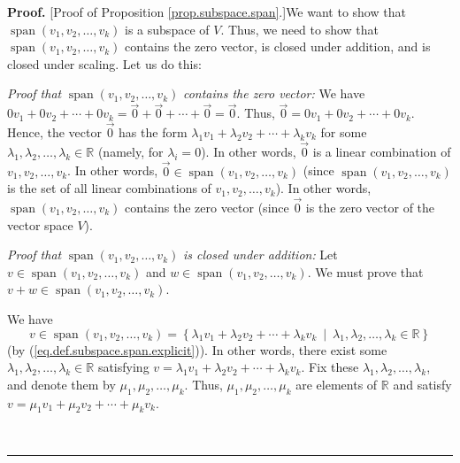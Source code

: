 \documentclass[numbers=enddot,12pt,final,onecolumn,notitlepage]{scrartcl}%
\theoremstyle{definition}
\newenvironment{proof}[1][Proof]{\noindent\textbf{#1.} }{\ \rule{0.5em}{0.5em}}
\begin{document}
\begin{proof}
[Proof of Proposition \ref{prop.subspace.span}.]We want to show that
$\operatorname{span}\left(  v_{1},v_{2},\ldots,v_{k}\right)  $ is a subspace
of $V$. Thus, we need to show that $\operatorname{span}\left(  v_{1}%
,v_{2},\ldots,v_{k}\right)  $ contains the zero vector, is closed under
addition, and is closed under scaling. Let us do this:

\textit{Proof that }$\operatorname{span}\left(  v_{1},v_{2},\ldots
,v_{k}\right)  $\textit{ contains the zero vector:} We have $0v_{1}%
+0v_{2}+\cdots+0v_{k}=\overrightarrow{0}+\overrightarrow{0}+\cdots
+\overrightarrow{0}=\overrightarrow{0}$. Thus, $\overrightarrow{0}%
=0v_{1}+0v_{2}+\cdots+0v_{k}$. Hence, the vector $\overrightarrow{0}$ has the
form $\lambda_{1}v_{1}+\lambda_{2}v_{2}+\cdots+\lambda_{k}v_{k}$ for some
$\lambda_{1},\lambda_{2},\ldots,\lambda_{k}\in\mathbb{R}$ (namely, for
$\lambda_{i}=0$). In other words, $\overrightarrow{0}$ is a linear combination
of $v_{1},v_{2},\ldots,v_{k}$. In other words, $\overrightarrow{0}%
\in\operatorname{span}\left(  v_{1},v_{2},\ldots,v_{k}\right)  $ (since
$\operatorname{span}\left(  v_{1},v_{2},\ldots,v_{k}\right)  $ is the set of
all linear combinations of $v_{1},v_{2},\ldots,v_{k}$). In other words,
$\operatorname{span}\left(  v_{1},v_{2},\ldots,v_{k}\right)  $ contains the
zero vector (since $\overrightarrow{0}$ is the zero vector of the vector space
$V$).

\textit{Proof that }$\operatorname{span}\left(  v_{1},v_{2},\ldots
,v_{k}\right)  $ \textit{is closed under addition:} Let $v\in
\operatorname{span}\left(  v_{1},v_{2},\ldots,v_{k}\right)  $ and
$w\in\operatorname{span}\left(  v_{1},v_{2},\ldots,v_{k}\right)  $. We must
prove that $v+w\in\operatorname{span}\left(  v_{1},v_{2},\ldots,v_{k}\right)
$.

We have
\[
v\in\operatorname{span}\left(  v_{1},v_{2},\ldots,v_{k}\right)  =\left\{
\lambda_{1}v_{1}+\lambda_{2}v_{2}+\cdots+\lambda_{k}v_{k}\ \mid\ \lambda
_{1},\lambda_{2},\ldots,\lambda_{k}\in\mathbb{R}\right\}
\]
(by (\ref{eq.def.subspace.span.explicit})). In other words, there exist some
$\lambda_{1},\lambda_{2},\ldots,\lambda_{k}\in\mathbb{R}$ satisfying
$v=\lambda_{1}v_{1}+\lambda_{2}v_{2}+\cdots+\lambda_{k}v_{k}$. Fix these
$\lambda_{1},\lambda_{2},\ldots,\lambda_{k}$, and denote them by $\mu_{1}%
,\mu_{2},\ldots,\mu_{k}$. Thus, $\mu_{1},\mu_{2},\ldots,\mu_{k}$ are elements
of $\mathbb{R}$ and satisfy $v=\mu_{1}v_{1}+\mu_{2}v_{2}+\cdots+\mu_{k}v_{k}$.


\end{proof}
\end{document}
